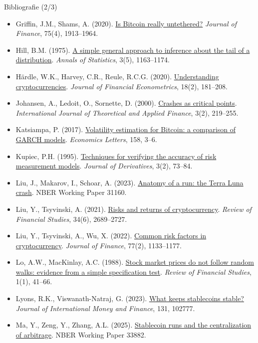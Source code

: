 \begin{frame}{Bibliografie (2/3)}
\itemsize{\tiny}
\begin{itemize}
    \item Griffin, J.M., Shams, A. (2020). \href{https://doi.org/10.1111/jofi.12903}{Is Bitcoin really untethered?} \textit{Journal of Finance}, 75(4), 1913--1964.
    \item Hill, B.M. (1975). \href{https://doi.org/10.1214/aos/1176343247}{A simple general approach to inference about the tail of a distribution}. \textit{Annals of Statistics}, 3(5), 1163--1174.
    \item Härdle, W.K., Harvey, C.R., Reule, R.C.G. (2020). \href{https://doi.org/10.1093/jjfinec/nbz033}{Understanding cryptocurrencies}. \textit{Journal of Financial Econometrics}, 18(2), 181--208.
    \item Johansen, A., Ledoit, O., Sornette, D. (2000). \href{https://doi.org/10.1142/S0219024900000115}{Crashes as critical points}. \textit{International Journal of Theoretical and Applied Finance}, 3(2), 219--255.
    \item Katsiampa, P. (2017). \href{https://doi.org/10.1016/j.econlet.2017.06.023}{Volatility estimation for Bitcoin: a comparison of GARCH models}. \textit{Economics Letters}, 158, 3--6.
    \item Kupiec, P.H. (1995). \href{https://doi.org/10.3905/jod.1995.407942}{Techniques for verifying the accuracy of risk measurement models}. \textit{Journal of Derivatives}, 3(2), 73--84.
    \item Liu, J., Makarov, I., Schoar, A. (2023). \href{https://doi.org/10.3386/w31160}{Anatomy of a run: the Terra Luna crash}. NBER Working Paper 31160.
    \item Liu, Y., Tsyvinski, A. (2021). \href{https://doi.org/10.1093/rfs/hhaa113}{Risks and returns of cryptocurrency}. \textit{Review of Financial Studies}, 34(6), 2689--2727.
    \item Liu, Y., Tsyvinski, A., Wu, X. (2022). \href{https://doi.org/10.1111/jofi.13119}{Common risk factors in cryptocurrency}. \textit{Journal of Finance}, 77(2), 1133--1177.
    \item Lo, A.W., MacKinlay, A.C. (1988). \href{https://doi.org/10.1093/rfs/1.1.41}{Stock market prices do not follow random walks: evidence from a simple specification test}. \textit{Review of Financial Studies}, 1(1), 41--66.
    \item Lyons, R.K., Viswanath-Natraj, G. (2023). \href{https://doi.org/10.1016/j.jimonfin.2022.102777}{What keeps stablecoins stable?} \textit{Journal of International Money and Finance}, 131, 102777.
    \item Ma, Y., Zeng, Y., Zhang, A.L. (2025). \href{https://doi.org/10.3386/w33882}{Stablecoin runs and the centralization of arbitrage}. NBER Working Paper 33882.
\end{itemize}
\end{frame}

